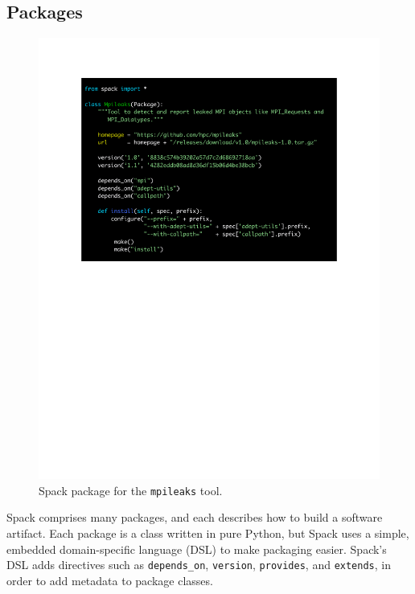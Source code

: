 
\subsection{Packages}

\begin{figure}
	\includegraphics[width=\columnwidth]{code/mpileaks.pdf}
	\caption{
		Spack package for the {\tt mpileaks} tool.
		\label{fig:mpileaks}
	}
\end{figure}

Spack comprises many packages, and each describes how to build a software
artifact.  Each package is a class written in pure Python, but Spack uses
a simple, embedded domain-specific language (DSL) to make packaging easier.
Spack's DSL adds directives such as {\tt depends\_on}, {\tt version},
{\tt provides}, and {\tt extends}, in order to add metadata to package classes.

